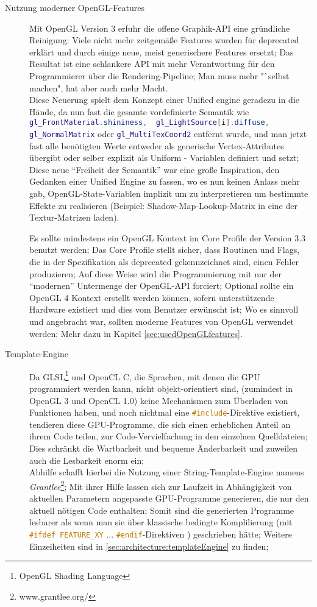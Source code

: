 \begin{description}
	\item[Nutzung moderner OpenGL-Features]
	Mit OpenGL Version 3 erfuhr die offene Graphik-API eine gründliche Reinigung: Viele nicht mehr zeitgemäße Features 
	wurden für deprecated erklärt und durch einige neue, meist generischere Features ersetzt;
	Das Resultat ist eine schlankere API mit mehr Verantwortung für den Programmierer über die Rendering-Pipeline;
	Man muss mehr "`selbst machen", hat aber auch mehr Macht.\\
	Diese Neuerung spielt dem Konzept einer Unified engine geradezu in die Hände, da nun fast die gesamte vordefinierte 
	Semantik wie 
	\lstinline[language=GLSL]|gl_FrontMaterial.shininess,  gl_LightSource[i].diffuse, gl_NormalMatrix| oder 
	\lstinline[language=GLSL]|gl_MultiTexCoord2|
 	entfernt wurde, und man jetzt fast alle benötigten Werte entweder als generische Vertex-Attributes übergibt oder 
 	selber explizit als Uniform - Variablen definiert und setzt; Diese neue "`Freiheit der Semantik"' war eine große 
 	Inspiration, den Gedanken einer Unified Engine zu fassen, wo es nun keinen Anlass mehr gab, OpenGL-State-Variablen 
 	implizit um zu interpretieren um bestimmte Effekte zu realisieren (Beispiel: Shadow-Map-Lookup-Matrix in eine der 	
 	Textur-Matrizen laden).
	
	Es sollte mindestens ein OpenGL Kontext im Core Profile der Version 3.3 benutzt werden; Das Core Profile stellt sicher,
	dass Routinen und Flags, die in der Spezifikation als deprecated gekennzeichnet sind, einen Fehler produzieren;
	Auf diese Weise wird die Programmierung mit nur der "`modernen"' Untermenge der OpenGL-API forciert;
	Optional sollte ein OpenGL 4 Kontext erstellt werden können, sofern unterstützende Hardware existiert und dies vom 
	Benutzer erwünscht ist;
	Wo es sinnvoll und angebracht war, sollten moderne Features von OpenGL verwendet werden;
	Mehr dazu in Kapitel \ref{sec:usedOpenGLfeatures}.

	
	\item[Template-Engine]
	Da GLSL\footnote{OpenGL Shading Language} und OpenCL C, die Sprachen, mit denen die GPU programmiert werden kann,
	nicht objekt-orientiert sind, (zumindest in OpenGL 3 und OpenCL 1.0) keine Mechanismen zum Überladen von Funktionen
	haben, und noch nichtmal eine \linebreak \lstinline[language=C]|#include|-Direktive existiert,
	tendieren diese GPU-Programme, die sich einen erheblichen Anteil an ihrem Code teilen, zur Code-Vervielfachung in den 	
	einzelnen Quelldateien;
	Dies schränkt die Wartbarkeit und bequeme Änderbarkeit und zuweilen auch die Lesbarkeit enorm ein;\\
	Abhilfe schafft hierbei die Nutzung einer String-Template-Engine namens \emph{Grantlee}\footnote{www.grantlee.org/};
	Mit ihrer Hilfe lassen sich zur Laufzeit in Abhängigkeit von aktuellen Parametern angepasste GPU-Programme generieren,
	die nur den aktuell nötigen Code enthalten;
	Somit sind die generierten Programme lesbarer als wenn man sie über klassische bedingte Komplilierung 
	(mit \lstinline[language=C]|#ifdef FEATURE_XY| ... \lstinline[language=C]|#endif|-Direktiven ) geschrieben hätte;
	Weitere Einzeiheiten sind in \ref{sec:architecture:templateEngine} zu finden;


\end{description}

